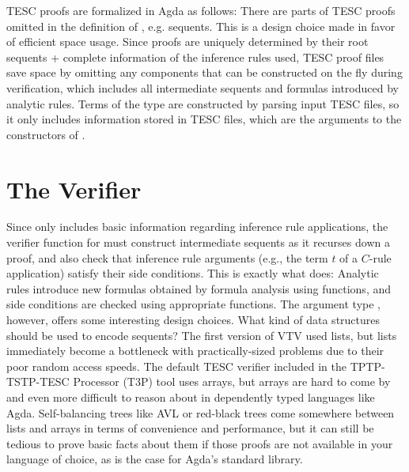 \documentclass[12pt]{article}
\begin{document}
TESC proofs are formalized in Agda as follows:
There are parts of TESC proofs omitted in the definition of 
, e.g. sequents. This is a design choice made in favor of
efficient space usage. Since proofs are uniquely determined by their
root sequents + complete information of the inference rules used,
TESC proof files save space by omitting any components that can be 
constructed on the fly during verification, which includes all intermediate 
sequents and formulas introduced by analytic rules. Terms of the type 
 are constructed by parsing input TESC files, 
so it only includes information stored in TESC files, which are the arguments 
to the constructors of .



\section{The Verifier} \label{sec:verifier} 

Since  only includes basic information regarding inference 
rule applications, the verifier function for  must construct 
intermediate sequents as it recurses down a proof, and also check that inference 
rule arguments (e.g., the term $t$ of a $C$-rule application) satisfy their side 
conditions. This is exactly what  does:
Analytic rules introduce new formulas obtained by formula analysis using 
 functions, and side conditions are checked using appropriate 
 functions. The argument type , however, 
offers some interesting design choices. What kind of data structures should be used 
to encode sequents? The first version of VTV used lists, but lists immediately become 
a bottleneck with practically-sized problems due to their poor random access speeds. 
The default TESC verifier included in the TPTP-TSTP-TESC Processor (T3P) tool uses arrays, 
but arrays are hard to come by and even more difficult to reason about in dependently 
typed languages like Agda. Self-balancing trees like AVL or red-black trees come 
somewhere between lists and arrays in terms of convenience and performance, but it 
can still be tedious to prove basic facts about them if those proofs are not 
available in your language of choice, as is the case for Agda's standard library.
\end{document}
